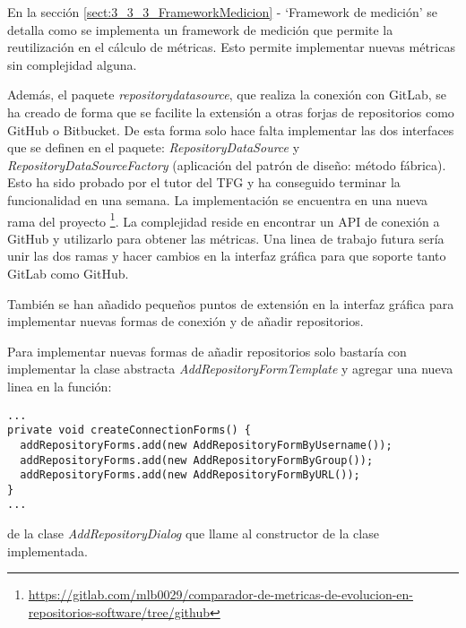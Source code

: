 En la sección \ref{sect:3_3_3_FrameworkMedicion} - `Framework de medición' se detalla como se implementa un framework de medición que permite la reutilización en el cálculo de métricas. Esto permite implementar nuevas métricas sin complejidad alguna.

Además, el paquete \textit{repositorydatasource}, que realiza la conexión con GitLab, se ha creado de forma que se facilite la extensión a otras forjas de repositorios como GitHub o Bitbucket. De esta forma solo hace falta implementar las dos interfaces que se definen en el paquete: \textit{RepositoryDataSource} y \textit{RepositoryDataSourceFactory} (aplicación del patrón de diseño: método fábrica). Esto ha sido probado por el tutor del TFG y ha conseguido terminar la funcionalidad en una semana. La implementación se encuentra en una nueva rama del proyecto \footnote{\url{https://gitlab.com/mlb0029/comparador-de-metricas-de-evolucion-en-repositorios-software/tree/github}}. La complejidad reside en encontrar un API de conexión a GitHub y utilizarlo para obtener las métricas. Una linea de trabajo futura sería unir las dos ramas y hacer cambios en la interfaz gráfica para que soporte tanto GitLab como GitHub.

También se han añadido pequeños puntos de extensión en la interfaz gráfica para implementar nuevas formas de conexión y de añadir repositorios. 

Para implementar nuevas formas de añadir repositorios solo bastaría con implementar la clase abstracta \textit{AddRepositoryFormTemplate} y agregar una nueva linea en la función:\\
\begin{minipage}{\linewidth}
{\tiny
\begin{lstlisting}[breaklines]
...
private void createConnectionForms() {
  addRepositoryForms.add(new AddRepositoryFormByUsername());
  addRepositoryForms.add(new AddRepositoryFormByGroup());
  addRepositoryForms.add(new AddRepositoryFormByURL());
}
...
\end{lstlisting}
}
\end{minipage}
 de la clase \textit{AddRepositoryDialog} que llame al constructor de la clase implementada.
 
